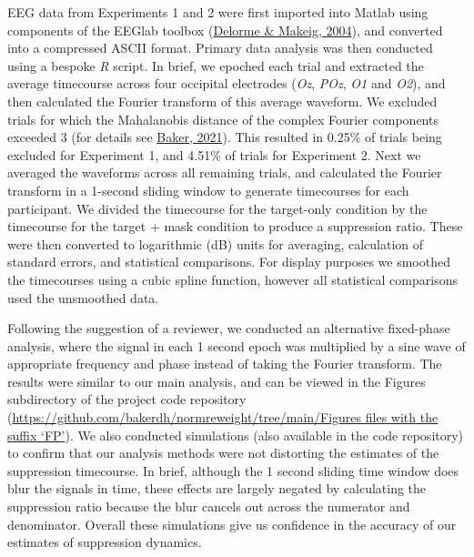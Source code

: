 \documentclass[
]{article}
\begin{document}
EEG data from Experiments 1 and 2 were first imported into Matlab using components of the EEGlab toolbox (\protect\hyperlink{ref-Delorme2004}{Delorme \& Makeig, 2004}), and converted into a compressed ASCII format. Primary data analysis was then conducted using a bespoke \emph{R} script. In brief, we epoched each trial and extracted the average timecourse across four occipital electrodes (\emph{Oz}, \emph{POz}, \emph{O1} and \emph{O2}), and then calculated the Fourier transform of this average waveform. We excluded trials for which the Mahalanobis distance of the complex Fourier components exceeded 3 (for details see \protect\hyperlink{ref-Baker2021}{Baker, 2021}). This resulted in 0.25\% of trials being excluded for Experiment 1, and 4.51\% of trials for Experiment 2. Next we averaged the waveforms across all remaining trials, and calculated the Fourier transform in a 1-second sliding window to generate timecourses for each participant. We divided the timecourse for the target-only condition by the timecourse for the target + mask condition to produce a suppression ratio. These were then converted to logarithmic (dB) units for averaging, calculation of standard errors, and statistical comparisons. For display purposes we smoothed the timecourses using a cubic spline function, however all statistical comparisons used the unsmoothed data.

Following the suggestion of a reviewer, we conducted an alternative fixed-phase analysis, where the signal in each 1 second epoch was multiplied by a sine wave of appropriate frequency and phase instead of taking the Fourier transform. The results were similar to our main analysis, and can be viewed in the Figures subdirectory of the project code repository (\href{https://github.com/bakerdh/normreweight/tree/main/Figures}{https://github.com/bakerdh/normreweight/tree/main/Figures files with the suffix `FP'}). We also conducted simulations (also available in the code repository) to confirm that our analysis methods were not distorting the estimates of the suppression timecourse. In brief, although the 1 second sliding time window does blur the signals in time, these effects are largely negated by calculating the suppression ratio because the blur cancels out across the numerator and denominator. Overall these simulations give us confidence in the accuracy of our estimates of suppression dynamics.
\end{document}
